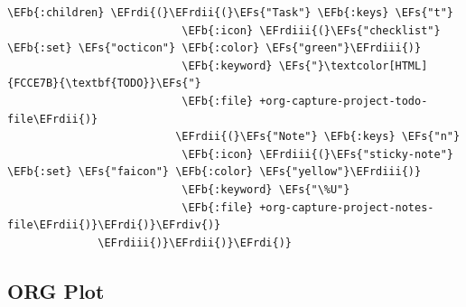 \documentclass{scrartcl}
\newcommand{\EFs}[1]{\textcolor{EFs}{#1}} %
\newcommand{\EFb}[1]{\textcolor{EFb}{#1}} %
\newcommand{\EFrdi}[1]{#1} %
\newcommand{\EFrdii}[1]{#1} %
\newcommand{\EFrdiii}[1]{#1} %
\newcommand{\EFrdiv}[1]{#1} %
\begin{document}
\begin{Code}
\begin{Verbatim}[]
               \EFb{:children} \EFrdi{(}\EFrdii{(}\EFs{"Task"} \EFb{:keys} \EFs{"t"}
                           \EFb{:icon} \EFrdiii{(}\EFs{"checklist"} \EFb{:set} \EFs{"octicon"} \EFb{:color} \EFs{"green"}\EFrdiii{)}
                           \EFb{:keyword} \EFs{"}\textcolor[HTML]{FCCE7B}{\textbf{TODO}}\EFs{"}
                           \EFb{:file} +org-capture-project-todo-file\EFrdii{)}
                          \EFrdii{(}\EFs{"Note"} \EFb{:keys} \EFs{"n"}
                           \EFb{:icon} \EFrdiii{(}\EFs{"sticky-note"} \EFb{:set} \EFs{"faicon"} \EFb{:color} \EFs{"yellow"}\EFrdiii{)}
                           \EFb{:keyword} \EFs{"\%U"}
                           \EFb{:file} +org-capture-project-notes-file\EFrdii{)}\EFrdi{)}\EFrdiv{)}
              \EFrdiii{)}\EFrdii{)}\EFrdi{)}
\end{Verbatim}
\end{Code}

\subsection{ORG Plot}
\label{sec:org53c3f2a}
\end{document}
